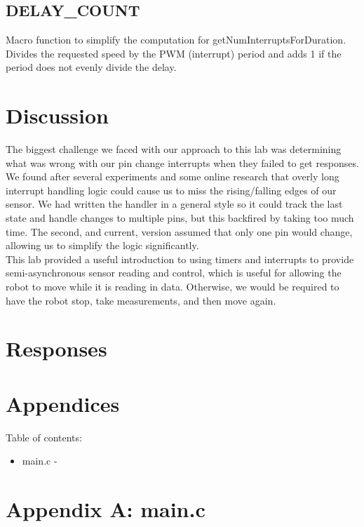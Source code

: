 \documentclass[letterpaper,11pt]{texMemo} %
\begin{document}
\subsection*{DELAY\_COUNT}
Macro function to simplify the computation for getNumInterruptsForDuration. Divides the requested speed by the PWM (interrupt) period and adds 1 if the period does not evenly divide the delay.

\section*{Discussion}
The biggest challenge we faced with our approach to this lab was determining what was wrong with our pin change interrupts when they failed to get responses. We found after several experiments and some online research that overly long interrupt handling logic could cause us to miss the rising/falling edges of our sensor. We had written the handler in a general style so it could track the last state and handle changes to multiple pins, but this backfired by taking too much time. The second, and current, version assumed that only one pin would change, allowing us to simplify the logic significantly.\\

This lab provided a useful introduction to using timers and interrupts to provide semi-asynchronous sensor reading and control, which is useful for allowing the robot to move while it is reading in data. Otherwise, we would be required to have the robot stop, take measurements, and then move again.


\section*{Responses}


\newpage
\section*{Appendices}
Table of contents:
\begin{itemize}
    \item main.c - %
\end{itemize}
\newpage

\section*{Appendix A: main.c}
\begin{tiny}

\end{tiny}
\newpage
\end{document}
